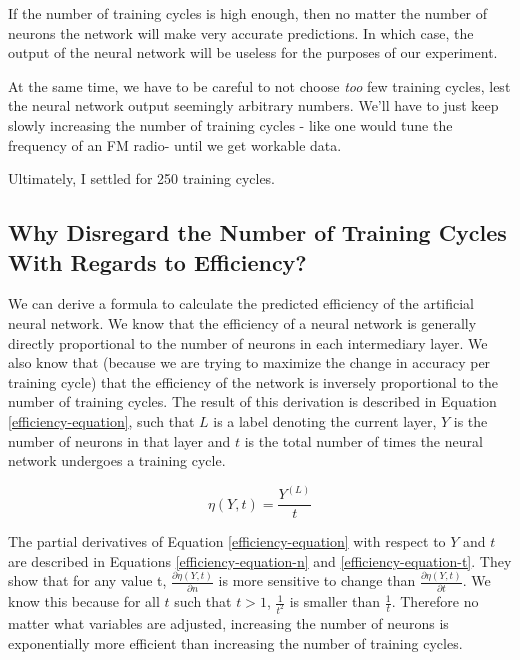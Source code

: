 \documentclass[12pt]{article}
\begin{document}
If the number of training cycles is high enough, then no matter the number of neurons the network will make very accurate predictions. In which case, the output of the neural network will be useless for the purposes of our experiment.

At the same time, we have to be careful to not choose \textit{too} few training cycles, lest the neural network output seemingly arbitrary numbers. We'll have to just keep slowly increasing the number of training cycles - like one would tune the frequency of an FM radio- until we get workable data.

Ultimately, I settled for 250 training cycles.

\subsection{Why Disregard the Number of Training Cycles With Regards to Efficiency?}


We can derive a formula to calculate the predicted efficiency of the artificial neural network. We know that the efficiency of a neural network is generally directly proportional to the number of neurons in each intermediary layer. We also know that (because we are trying to maximize the change in accuracy per training cycle) that the efficiency of the network is inversely proportional to the number of training cycles. The result of this derivation is described in Equation \ref{efficiency-equation}, such that $L$ is a label denoting the current layer, $Y$ is the number of neurons in that layer and $t$ is the total number of times the neural network undergoes a training cycle.

\begin{equation} \label{efficiency-equation}
    \eta(Y, t) =  \frac{Y^{(L)}}{t}
\end{equation}

The partial derivatives of Equation \ref{efficiency-equation} with respect to $Y$ and $t$ are described in Equations \ref{efficiency-equation-n} and \ref{efficiency-equation-t}. They show that for any value t, $\frac{\partial \eta(Y, t)}{\partial n}$ is more sensitive to change than $\frac{\partial \eta(Y, t)}{\partial t}$. We know this because for all $t$ such that $t > 1$, $\frac{1}{t^2}$ is smaller than $\frac{1}{t}$. Therefore no matter what variables are adjusted, increasing the number of neurons is exponentially more efficient than increasing the number of training cycles.
\end{document}
